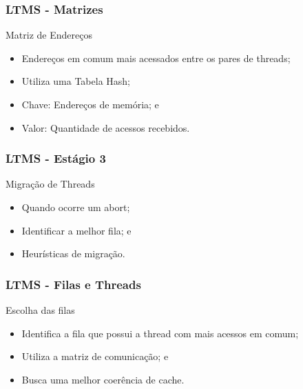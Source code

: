 \documentclass[10pt, pdf,xcolor=pdftex,dvipsnames,table]{beamer}
\begin{document}
\begin{frame} \frametitle{LTMS - Matrizes}
    \begin{block}{Matriz de Endereços}
        \begin{itemize}
        	\item Endereços em comum mais acessados entre os pares de threads;
        	\item Utiliza uma Tabela Hash;
        	\item Chave: Endereços de memória; e 
            \item Valor: Quantidade de acessos recebidos.
        \end{itemize}
    \end{block}
\end{frame}

\begin{frame} \frametitle{LTMS - Estágio 3}
    \begin{block}{Migração de Threads}
        \begin{itemize}
        	\item Quando ocorre um abort;
        	\item Identificar a melhor fila; e
            \item Heurísticas de migração.
        \end{itemize}
    \end{block}
\end{frame}

\begin{frame} \frametitle{LTMS - Filas e Threads}
    \begin{block}{Escolha das filas}
        \begin{itemize}
        	\item Identifica a fila que possui a thread com mais acessos em comum;
        	\item Utiliza a matriz de comunicação; e
        	\item Busca uma melhor coerência de cache.
        \end{itemize}
    \end{block}
\end{frame}
\end{document}
